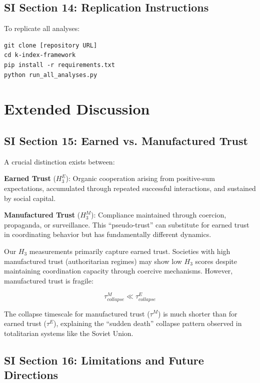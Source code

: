 \documentclass[11pt,a4paper]{article}
\newcommand{\Hthree}{H_3}
\begin{document}
\subsection{SI Section 14: Replication Instructions}

To replicate all analyses:
\begin{verbatim}
git clone [repository URL]
cd k-index-framework
pip install -r requirements.txt
python run_all_analyses.py
\end{verbatim}

\section{Extended Discussion}

\subsection{SI Section 15: Earned vs. Manufactured Trust}

A crucial distinction exists between:

\textbf{Earned Trust} ($\Hthree^E$): Organic cooperation arising from positive-sum expectations, accumulated through repeated successful interactions, and sustained by social capital.

\textbf{Manufactured Trust} ($\Hthree^M$): Compliance maintained through coercion, propaganda, or surveillance. This ``pseudo-trust'' can substitute for earned trust in coordinating behavior but has fundamentally different dynamics.

Our $\Hthree$ measurements primarily capture earned trust. Societies with high manufactured trust (authoritarian regimes) may show low $\Hthree$ scores despite maintaining coordination capacity through coercive mechanisms. However, manufactured trust is fragile:

\begin{equation}
\tau_{collapse}^{M} \ll \tau_{collapse}^{E}
\end{equation}

The collapse timescale for manufactured trust ($\tau^M$) is much shorter than for earned trust ($\tau^E$), explaining the ``sudden death'' collapse pattern observed in totalitarian systems like the Soviet Union.

\subsection{SI Section 16: Limitations and Future Directions}
\end{document}
